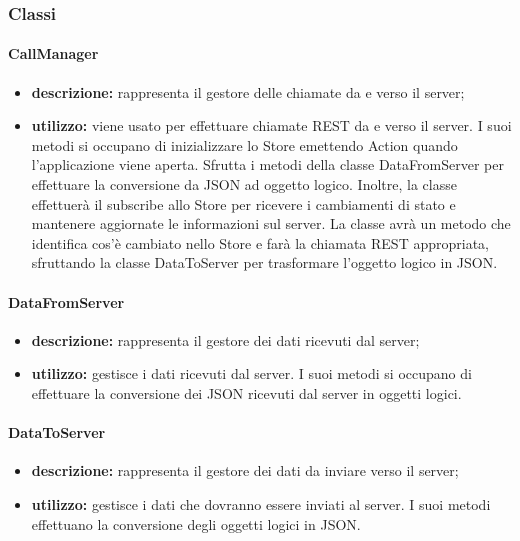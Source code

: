 \subsubsection{Classi}
\paragraph{CallManager}
\begin{itemize}
	\item \textbf{descrizione:} rappresenta il gestore delle chiamate da e verso il server;
	\item \textbf{utilizzo:} viene usato per effettuare chiamate REST da e verso il server. I suoi metodi si occupano di inizializzare lo Store emettendo Action quando l'applicazione viene aperta. Sfrutta i metodi della classe DataFromServer per effettuare la conversione da JSON ad oggetto logico. Inoltre, la classe effettuerà il subscribe allo Store per ricevere i cambiamenti di stato e mantenere aggiornate le informazioni sul server. La classe avrà un metodo che identifica cos'è cambiato nello Store e farà la chiamata REST appropriata, sfruttando la classe DataToServer per trasformare l'oggetto logico in JSON.
\end{itemize}
\paragraph{DataFromServer}
\begin{itemize}
	\item \textbf{descrizione:} rappresenta il gestore dei dati ricevuti dal server;
	\item \textbf{utilizzo:} gestisce i dati ricevuti dal server. I suoi metodi si occupano di effettuare la conversione dei JSON ricevuti dal server in oggetti logici.
\end{itemize}
\paragraph{DataToServer}
\begin{itemize}
	\item \textbf{descrizione:} rappresenta il gestore dei dati da inviare verso il server;
	\item \textbf{utilizzo:} gestisce i dati che dovranno essere inviati al server. I suoi metodi effettuano la conversione degli oggetti logici in JSON.
\end{itemize}
\newpage
